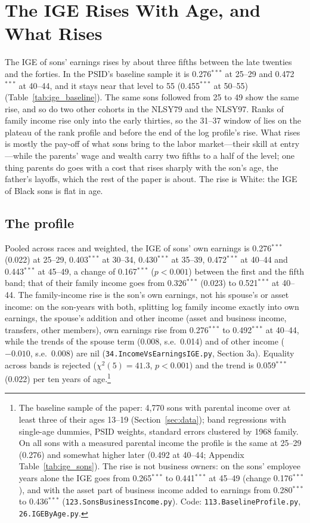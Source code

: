 \section{The IGE Rises With Age, and What Rises}\label{sec:ageprofile}

The IGE of sons' earnings rises by about three fifths between the late twenties and the forties. In the PSID's
baseline sample it is 0.276$^{***}$ at 25--29 and 0.472$^{***}$ at 40--44, and it stays near that level to 55
(0.455$^{***}$ at 50--55) (Table~\ref{tab:ige_baseline}). The
same sons followed from 25 to 49 show the same rise, and so do two other cohorts in the NLSY79 and the NLSY97. Ranks of
family income rise only into the early thirties, so the 31--37 window of \citet{chetty2020race} lies on the plateau of the
rank profile and before the end of the log profile's rise. What rises is mostly the pay-off of what sons bring to the
labor market---their skill at entry---while the parents' wage and wealth carry two fifths to a half of the level; one thing
parents do goes with a cost that rises sharply with the son's age, the father's layoffs, which the rest of the paper is
about. The rise is
White: the IGE of Black sons is flat in age.

\subsection{The profile}

Pooled across races and weighted, the IGE of sons' own earnings is 0.276$^{***}$ (0.022) at 25--29, 0.403$^{***}$ at
30--34, 0.430$^{***}$ at 35--39, 0.472$^{***}$ at 40--44 and 0.443$^{***}$ at 45--49, a change of 0.167$^{***}$ ($p<0.001$)
between the first and the fifth band; that of their family income goes from 0.326$^{***}$ (0.023) to 0.521$^{***}$ at
40--44. The family-income rise is the son's own earnings, not his spouse's or asset income: on the son-years with both,
splitting log family income exactly into own earnings, the spouse's addition and other income (asset and business
income, transfers, other members), own earnings rise from 0.276$^{***}$ to 0.492$^{***}$ at 40--44, while the trends of
the spouse term (0.008, s.e.\ 0.014) and of other income ($-0.010$, s.e.\ 0.008) are nil
(\texttt{34.IncomeVsEarningsIGE.py}, Section 3a). Equality across bands is rejected ($\chi^2(5) = 41.3$, $p<0.001$) and the trend is 0.059$^{***}$ (0.022) per ten
years of age.\footnote{The baseline sample of the paper: 4,770 sons with parental income over at least three of their
ages 13--19 (Section~\ref{sec:data}); band regressions with single-age dummies, PSID weights, standard errors clustered
by 1968 family. On all sons with a measured parental income the profile is the same at 25--29 (0.276) and somewhat
higher later (0.492 at 40--44; Appendix Table~\ref{tab:ige_sons}). The rise is not business owners: on the sons'
employee years alone the IGE goes from 0.265$^{***}$ to 0.441$^{***}$ at 45--49 (change 0.176$^{***}$), and with the
asset part of business income added to earnings from 0.280$^{***}$ to 0.436$^{***}$ (\texttt{123.SonsBusinessIncome.py}).
Code: \texttt{113.BaselineProfile.py}, \texttt{26.IGEByAge.py}.}

